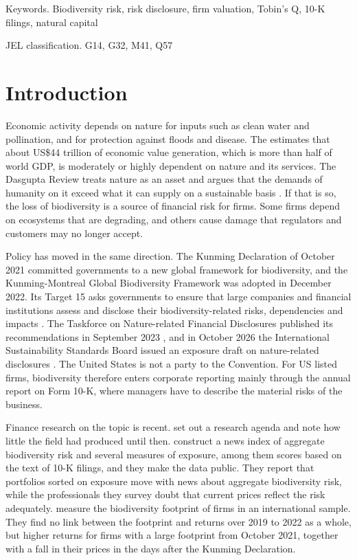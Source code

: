 \documentclass[12pt,a4paper]{article}
\begin{document}
\medskip
\noindent Keywords. Biodiversity risk, risk disclosure, firm valuation, Tobin's Q, 10-K filings, natural capital

\noindent JEL classification. G14, G32, M41, Q57\par
\endgroup
\clearpage

\begingroup{}
\tableofcontents
\endgroup
\clearpage

\section{Introduction}

Economic activity depends on nature for inputs such as clean water and pollination, and for protection against floods and disease. The \citet{wef2020} estimates that about US\$44 trillion of economic value generation, which is more than half of world GDP, is moderately or highly dependent on nature and its services. The Dasgupta Review treats nature as an asset and argues that the demands of humanity on it exceed what it can supply on a sustainable basis \citep{dasgupta2021}. If that is so, the loss of biodiversity is a source of financial risk for firms. Some firms depend on ecosystems that are degrading, and others cause damage that regulators and customers may no longer accept.

Policy has moved in the same direction. The Kunming Declaration of October 2021 committed governments to a new global framework for biodiversity, and the Kunming-Montreal Global Biodiversity Framework was adopted in December 2022. Its Target 15 asks governments to ensure that large companies and financial institutions assess and disclose their biodiversity-related risks, dependencies and impacts \citep{cbd2022}. The Taskforce on Nature-related Financial Disclosures published its recommendations in September 2023 \citep{tnfd2023}, and in October 2026 the International Sustainability Standards Board issued an exposure draft on nature-related disclosures \citep{issb2026}. The United States is not a party to the Convention. For US listed firms, biodiversity therefore enters corporate reporting mainly through the annual report on Form 10-K, where managers have to describe the material risks of the business.

Finance research on the topic is recent. \citet{karolyi2023} set out a research agenda and note how little the field had produced until then. \citet{giglio2026} construct a news index of aggregate biodiversity risk and several measures of exposure, among them scores based on the text of 10-K filings, and they make the data public. They report that portfolios sorted on exposure move with news about aggregate biodiversity risk, while the professionals they survey doubt that current prices reflect the risk adequately. \citet{garel2024} measure the biodiversity footprint of firms in an international sample. They find no link between the footprint and returns over 2019 to 2022 as a whole, but higher returns for firms with a large footprint from October 2021, together with a fall in their prices in the days after the Kunming Declaration.
\end{document}
